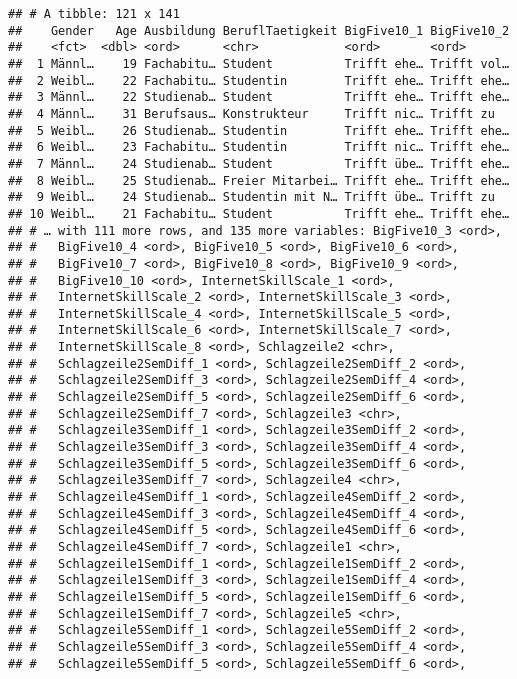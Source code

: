 \documentclass[]{article}
\begin{document}
\begin{verbatim}
## # A tibble: 121 x 141
##    Gender   Age Ausbildung BeruflTaetigkeit BigFive10_1 BigFive10_2
##    <fct>  <dbl> <ord>      <chr>            <ord>       <ord>      
##  1 Männl…    19 Fachabitu… Student          Trifft ehe… Trifft vol…
##  2 Weibl…    22 Fachabitu… Studentin        Trifft ehe… Trifft ehe…
##  3 Männl…    22 Studienab… Student          Trifft ehe… Trifft ehe…
##  4 Männl…    31 Berufsaus… Konstrukteur     Trifft nic… Trifft zu  
##  5 Weibl…    26 Studienab… Studentin        Trifft ehe… Trifft ehe…
##  6 Weibl…    23 Fachabitu… Studentin        Trifft nic… Trifft ehe…
##  7 Männl…    24 Studienab… Student          Trifft übe… Trifft ehe…
##  8 Weibl…    25 Studienab… Freier Mitarbei… Trifft ehe… Trifft ehe…
##  9 Weibl…    24 Studienab… Studentin mit N… Trifft übe… Trifft zu  
## 10 Weibl…    21 Fachabitu… Student          Trifft ehe… Trifft ehe…
## # … with 111 more rows, and 135 more variables: BigFive10_3 <ord>,
## #   BigFive10_4 <ord>, BigFive10_5 <ord>, BigFive10_6 <ord>,
## #   BigFive10_7 <ord>, BigFive10_8 <ord>, BigFive10_9 <ord>,
## #   BigFive10_10 <ord>, InternetSkillScale_1 <ord>,
## #   InternetSkillScale_2 <ord>, InternetSkillScale_3 <ord>,
## #   InternetSkillScale_4 <ord>, InternetSkillScale_5 <ord>,
## #   InternetSkillScale_6 <ord>, InternetSkillScale_7 <ord>,
## #   InternetSkillScale_8 <ord>, Schlagzeile2 <chr>,
## #   Schlagzeile2SemDiff_1 <ord>, Schlagzeile2SemDiff_2 <ord>,
## #   Schlagzeile2SemDiff_3 <ord>, Schlagzeile2SemDiff_4 <ord>,
## #   Schlagzeile2SemDiff_5 <ord>, Schlagzeile2SemDiff_6 <ord>,
## #   Schlagzeile2SemDiff_7 <ord>, Schlagzeile3 <chr>,
## #   Schlagzeile3SemDiff_1 <ord>, Schlagzeile3SemDiff_2 <ord>,
## #   Schlagzeile3SemDiff_3 <ord>, Schlagzeile3SemDiff_4 <ord>,
## #   Schlagzeile3SemDiff_5 <ord>, Schlagzeile3SemDiff_6 <ord>,
## #   Schlagzeile3SemDiff_7 <ord>, Schlagzeile4 <chr>,
## #   Schlagzeile4SemDiff_1 <ord>, Schlagzeile4SemDiff_2 <ord>,
## #   Schlagzeile4SemDiff_3 <ord>, Schlagzeile4SemDiff_4 <ord>,
## #   Schlagzeile4SemDiff_5 <ord>, Schlagzeile4SemDiff_6 <ord>,
## #   Schlagzeile4SemDiff_7 <ord>, Schlagzeile1 <chr>,
## #   Schlagzeile1SemDiff_1 <ord>, Schlagzeile1SemDiff_2 <ord>,
## #   Schlagzeile1SemDiff_3 <ord>, Schlagzeile1SemDiff_4 <ord>,
## #   Schlagzeile1SemDiff_5 <ord>, Schlagzeile1SemDiff_6 <ord>,
## #   Schlagzeile1SemDiff_7 <ord>, Schlagzeile5 <chr>,
## #   Schlagzeile5SemDiff_1 <ord>, Schlagzeile5SemDiff_2 <ord>,
## #   Schlagzeile5SemDiff_3 <ord>, Schlagzeile5SemDiff_4 <ord>,
## #   Schlagzeile5SemDiff_5 <ord>, Schlagzeile5SemDiff_6 <ord>,

\end{verbatim}
\end{document}
